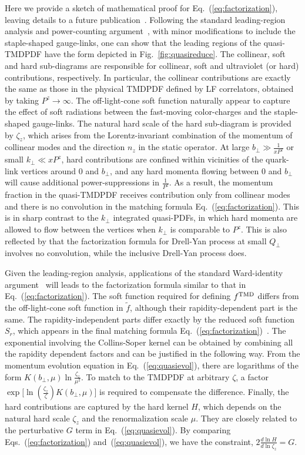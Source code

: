 \documentclass[twocolumn,aps,prd,preprintnumbers,superscriptaddress,10pt]{revtex4-1}
\begin{document}
Here we provide a sketch of mathematical proof for Eq.~(\ref{eq:factorization}), leaving details to a future publication~\cite{future}. Following the standard leading-region analysis and power-counting argument~\cite{Collins:2011zzd}, with minor modifications to include the staple-shaped gauge-links, one can show that the leading regions of the quasi-TMDPDF have the form depicted in Fig.~\ref{fig:quasireduce}. The collinear, soft and hard sub-diagrams are responsible for collinear, soft and ultraviolet (or hard) contributions, respectively.
In particular, the collinear contributions are exactly the same as those in the physical TMDPDF
defined by LF correlators, obtained by taking $P^z\to\infty$. The off-light-cone soft function naturally
appear to capture the effect of soft radiations between the fast-moving color-charges and the
staple-shaped gauge-links. The natural
hard scale of the hard sub-diagram is provided by $\zeta_z$, which arises from the Lorentz-invariant
combination of the momentum of collinear modes and the direction $n_z$ in the static operator.
At large $b_\perp \gg \frac{1}{xP^z}$ or small $k_\perp \ll xP^z$, hard contributions are confined within vicinities of the quark-link vertices around $0$ and $b_\perp$, and any hard momenta flowing between $0$ and $b_\perp$ will cause additional power-suppressions in $\frac{1}{P^z}$. As a result,  the momentum fraction in the quasi-TMDPDF
receives contribution only from collinear modes and there is no convolution in the matching formula Eq.~(\ref{eq:factorization}). This is in sharp contrast to the $k_\perp$ integrated quasi-PDFs, in which hard momenta are allowed to flow between the vertices when $k_\perp$ is comparable to $P^z$. This is also reflected by
that the factorization formula for Drell-Yan process at small $Q_\perp$ involves no convolution, while the inclusive Drell-Yan process does.

Given the leading-region analysis, applications of the standard Ward-identity argument~\cite{Collins:2011zzd} will leads to the factorization formula similar to that in Eq.~(\ref{eq:factorization}). The soft function
required for defining $f^{\rm TMD}$ differs from the off-light-cone soft function in $\tilde f$, although
their rapidity-dependent part is the same. The rapidity-independent parts differ exactly by
the reduced soft function $S_r$, which appears in the final matching formula Eq.~(\ref{eq:factorization})~\cite{Ji:2014gla}.
The exponential involving the Collins-Soper kernel can be obtained by combining all the rapidity dependent factors and can be justified in the following way. From the momentum evolution equation in Eq.~(\ref{eq:quasievol}), there are logarithms of the form $K(b_\perp,\mu)\ln \frac{\zeta_z}{\mu^2} $. To match to the TMDPDF at arbitrary $\zeta$, a factor $\exp\big[\ln (\frac{\zeta_z}{\zeta})K(b_\perp,\mu)\big]$ is required to compensate the difference. Finally, the hard contributions are captured by the hard kernel $H$, which depends on the natural hard scale $\zeta_z$ and the renormalization scale $\mu$. They are closely related to the perturbative $G$ term in Eq.~(\ref{eq:quasievol}). By comparing Eqs.~(\ref{eq:factorization}) and~(\ref{eq:quasievol}), we have the constraint, $2\frac{d\ln H}{d\ln \zeta_z}=G$.
\end{document}
